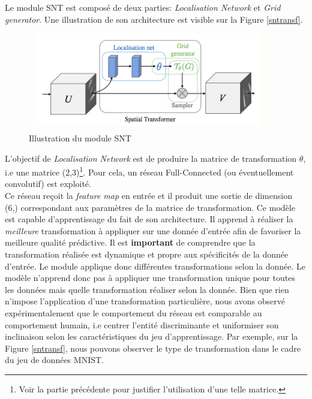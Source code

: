 \noindent Le module SNT est composé de deux parties: \textit{Localisation Network} et \textit{Grid generator}. Une illustration de son architecture est visible sur la Figure \ref{sntransf}.\\

\begin{figure}
    \centering
    \includegraphics[scale=0.4]{./tex/attention-deep-learning/sntmod.png}
    \caption{Illustration du module SNT}
    \label{sntmod}
\end{figure}


\noindent L'objectif de \textit{Localisation Network} est de produire la matrice de transformation $\theta$, i.e une matrice (2,3)\footnote{Voir la partie précédente pour justifier l'utilisation d'une telle matrice.}. Pour cela, un réseau Full-Connected (ou éventuellement convolutif) est exploité. \\

\noindent Ce réseau reçoit la \textit{feature map} en entrée et il produit une sortie de dimension (6,) correspondant aux paramètres de la matrice de transformation. Ce modèle est capable d'apprentissage du fait de son architecture. Il apprend à réaliser la \textit{meilleure} transformation à appliquer sur une donnée d'entrée afin de favoriser la meilleure qualité prédictive. Il est \textbf{important} de comprendre que la transformation réalisée est dynamique et propre aux spécificités de la donnée d'entrée. Le module applique donc différentes transformations selon la donnée. Le modèle n'apprend donc pas à appliquer une transformation unique pour toutes les données mais quelle transformation réaliser selon la donnée. Bien que rien n'impose l'application d'une transformation particulière, nous avons observé expérimentalement que le comportement du réseau est comparable au comportement humain, i.e centrer l'entité discriminante et uniformiser son inclinaison selon les caractéristiques du jeu d'apprentissage. Par exemple, sur la Figure \ref{sntransf}, nous pouvons observer le type de transformation dans le cadre du jeu de données MNIST.\\

